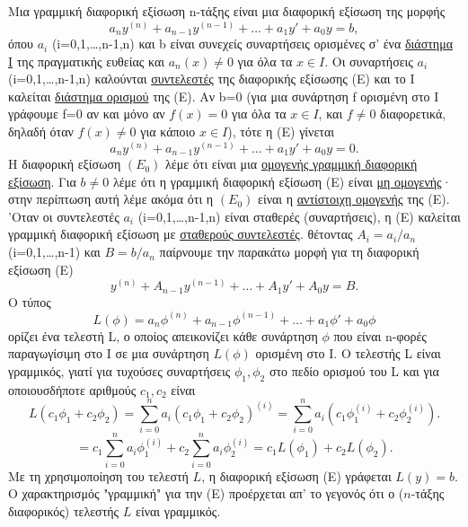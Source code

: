 \documentclass[11pt,a4paper,twoside]{book}
\begin{document}
Μια γραμμική διαφορική εξίσωση n-τάξης είναι μια διαφορική εξίσωση της μορφής
\begin{equation}\label{eq:E}
a_n y^{(n)} + a_{n-1} y^{(n-1)} + \dots + a_1 y' + a_0 y = b, \tag{E}
\end{equation}
όπου $a_i$ (i=0,1,\dots,n-1,n) και b είναι συνεχείς συναρτήσεις ορισμένες σ' ένα \underline{διάστημα Ι} της πραγματικής ευθείας και $a_n(x)\ne 0$ για όλα τα $x\in I$. Οι συναρτήσεις $a_i$ (i=0,1,\dots,n-1,n) καλούνται \underline{συντελεστές} της διαφορικής εξίσωσης (Ε) και το Ι καλείται \underline{διάστημα ορισμού} της (Ε). Αν b=0 (για μια συνάρτηση f ορισμένη στο Ι γράφουμε f=0 αν και μόνο αν $f(x)=0$ για όλα τα $x\in I$, και $f\ne 0$ διαφορετικά, δηλαδή όταν $f(x)\ne 0$ για κάποιο $x\in I$), τότε η (Ε) γίνεται
\begin{equation}\label{eq:E0}
a_n y^{(n)} + a_{n-1} y^{(n-1)} + \dots + a_1 y' + a_0 y = 0. \tag{$E_0$}
\end{equation}
Η διαφορική εξίσωση $(E_0)$ λέμε ότι είναι μια \underline{ομογενής γραμμική διαφορική εξίσωση}. Για $b\ne 0$ λέμε ότι η γραμμική διαφορική εξίσωση (Ε) είναι \underline{μη ομογενής}· στην περίπτωση αυτή λέμε ακόμα ότι η $(E_0)$ είναι η \underline{αντίστοιχη ομογενής} της (Ε). 'Οταν οι συντελεστές $a_i$ (i=0,1,\dots,n-1,n) είναι σταθερές (συναρτήσεις), η (Ε) καλείται γραμμική διαφορική εξίσωση με \underline{σταθερούς συντελεστές}. θέτοντας $A_i=a_i/a_n$ (i=0,1,\dots,n-1) και $B=b/a_n$ παίρνουμε την παρακάτω μορφή για τη διαφορική εξίσωση (Ε)
\[
y^{(n)} + A_{n-1} y^{(n-1)} + \dots + A_1 y' + A_0 y = B.
\]
Ο τύπος
\[
L(\phi) = a_n \phi^{(n)} + a_{n-1} \phi^{(n-1)} + \dots + a_1 \phi' + a_0 \phi
\]
ορίζει ένα τελεστή L, ο οποίος απεικονίζει κάθε συνάρτηση $\phi$ που είναι n-φορές παραγωγίσιμη στο Ι σε μια συνάρτηση $L(\phi)$ ορισμένη στο Ι. Ο τελεστής L είναι γραμμικός, γιατί για τυχούσες συναρτήσεις $\phi_1, \phi_2$ στο πεδίο ορισμού του L και για οποιουσδήποτε αριθμούς $c_1, c_2$ είναι
\[
L(c_1\phi_1+c_2\phi_2) = \sum_{i=0}^{n} a_i (c_1\phi_1+c_2\phi_2)^{(i)} = \sum_{i=0}^{n} a_i (c_1\phi_1^{(i)}+c_2\phi_2^{(i)}).
\]
\[
= c_1 \sum_{i=0}^{n} a_i \phi_1^{(i)} + c_2 \sum_{i=0}^{n} a_i \phi_2^{(i)} = c_1 L(\phi_1) + c_2 L(\phi_2).
\]
Με τη χρησιμοποίηση του τελεστή $L$, η διαφορική εξίσωση (Ε) γράφεται $L(y)=b$. Ο χαρακτηρισμός "γραμμική" για την (Ε) προέρχεται απ' το γεγονός ότι ο ($n$-τάξης διαφορικός) τελεστής $L$ είναι γραμμικός.
\end{document}
